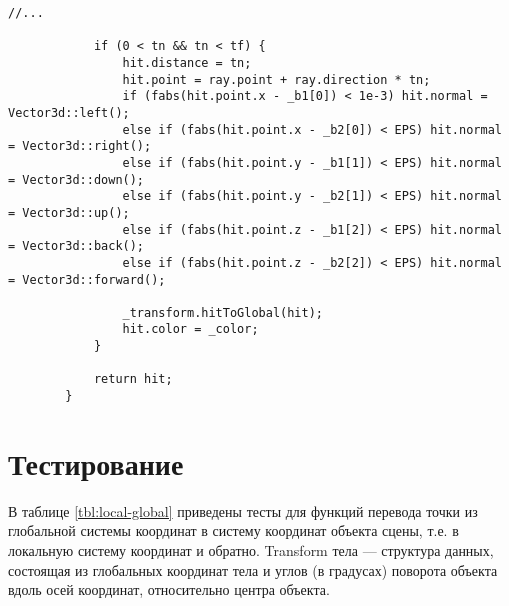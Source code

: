 \begin{center}
	\captionsetup{justification=raggedright,singlelinecheck=off}
	\begin{lstlisting}[label=lst:box_hit_end, caption=Алгоритм нахождения пересечения луча с параллелепипедом (окончание)]
			//...
			
			if (0 < tn && tn < tf) {
				hit.distance = tn;
				hit.point = ray.point + ray.direction * tn;
				if (fabs(hit.point.x - _b1[0]) < 1e-3) hit.normal = Vector3d::left();
				else if (fabs(hit.point.x - _b2[0]) < EPS) hit.normal = Vector3d::right();
				else if (fabs(hit.point.y - _b1[1]) < EPS) hit.normal = Vector3d::down();
				else if (fabs(hit.point.y - _b2[1]) < EPS) hit.normal = Vector3d::up();
				else if (fabs(hit.point.z - _b1[2]) < EPS) hit.normal = Vector3d::back();
				else if (fabs(hit.point.z - _b2[2]) < EPS) hit.normal = Vector3d::forward();
				
				_transform.hitToGlobal(hit);
				hit.color = _color;
			}
			
			return hit;
		}
	\end{lstlisting}
\end{center}

\clearpage

\section{Тестирование}

В таблице \ref{tbl:local-global} приведены тесты для функций перевода точки из глобальной системы координат в систему координат объекта сцены, т.е. в локальную систему координат и обратно. Transform тела --- структура данных, состоящая из глобальных координат тела и углов (в градусах) поворота объекта вдоль осей координат, относительно центра объекта.

